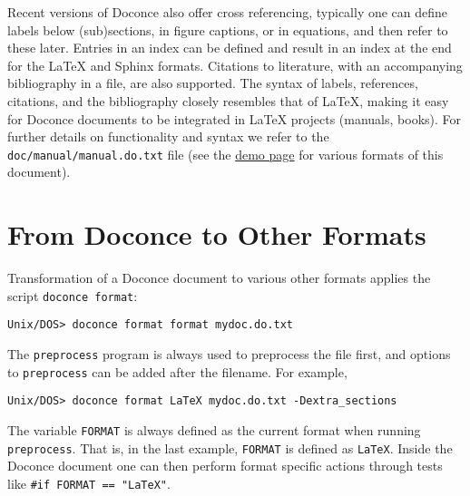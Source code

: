 \documentclass{article}
\begin{document}
Recent versions of Doconce also offer cross referencing, typically one
can define labels below (sub)sections, in figure captions, or in
equations, and then refer to these later. Entries in an index can be
defined and result in an index at the end for the {\LaTeX} and Sphinx
formats. Citations to literature, with an accompanying bibliography in
a file, are also supported. The syntax of labels, references,
citations, and the bibliography closely resembles that of {\LaTeX},
making it easy for Doconce documents to be integrated in {\LaTeX}
projects (manuals, books). For further details on functionality and
syntax we refer to the {\fontsize{10pt}{10pt}\verb!doc/manual/manual.do.txt!} file (see the
\href{https://doconce.googlecode.com/hg/doc/demos/manual/index.html}{demo page}
for various formats of this document).




\section{From Doconce to Other Formats}

\label{doconce2formats}

Transformation of a Doconce document to various other
formats applies the script {\fontsize{10pt}{10pt}\verb!doconce format!}:
\vspace{4pt}
\begin{Verbatim}[numbers=none,frame=lines,label=\fbox{{\tiny Terminal}},fontsize=\fontsize{9pt}{9pt},
labelposition=topline,framesep=2.5mm,framerule=0.7pt]
Unix/DOS> doconce format format mydoc.do.txt
\end{Verbatim}
The {\fontsize{10pt}{10pt}\verb!preprocess!} program is always used to preprocess the file first,
and options to {\fontsize{10pt}{10pt}\verb!preprocess!} can be added after the filename. For example,
\vspace{4pt}
\begin{Verbatim}[numbers=none,frame=lines,label=\fbox{{\tiny Terminal}},fontsize=\fontsize{9pt}{9pt},
labelposition=topline,framesep=2.5mm,framerule=0.7pt]
Unix/DOS> doconce format LaTeX mydoc.do.txt -Dextra_sections
\end{Verbatim}
The variable {\fontsize{10pt}{10pt}\verb!FORMAT!} is always defined as the current format when
running {\fontsize{10pt}{10pt}\verb!preprocess!}. That is, in the last example, {\fontsize{10pt}{10pt}\verb!FORMAT!} is
defined as {\fontsize{10pt}{10pt}\verb!LaTeX!}. Inside the Doconce document one can then perform
format specific actions through tests like {\fontsize{10pt}{10pt}\verb!#if FORMAT == "LaTeX"!}.
\end{document}
